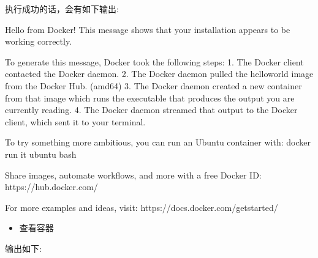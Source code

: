 \documentclass[letterpaper,10pt,english]{sphinxmanual}
\begin{document}
执行成功的话，会有如下输出:

\begin{sphinxVerbatim}[commandchars=\\\{\}]
Hello from Docker!
This message shows that your installation appears to be working correctly.

To generate this message, Docker took the following steps:
 1. The Docker client contacted the Docker daemon.
 2. The Docker daemon pulled the \PYGZdq{}hello\PYGZhy{}world\PYGZdq{} image from the Docker Hub.
    (amd64)
 3. The Docker daemon created a new container from that image which runs the
    executable that produces the output you are currently reading.
 4. The Docker daemon streamed that output to the Docker client, which sent it
    to your terminal.

To try something more ambitious, you can run an Ubuntu container with:
 \PYGZdl{} docker run \PYGZhy{}it ubuntu bash

Share images, automate workflows, and more with a free Docker ID:
 https://hub.docker.com/

For more examples and ideas, visit:
 https://docs.docker.com/get\PYGZhy{}started/
\end{sphinxVerbatim}
\begin{itemize}
\item {} 
查看容器

\end{itemize}

\begin{sphinxVerbatim}[commandchars=\\\{\}]
   
\end{sphinxVerbatim}

输出如下:

\begin{sphinxVerbatim}[commandchars=\\\{\}]
                                                                                            
                                                               
\end{sphinxVerbatim}
\end{document}

